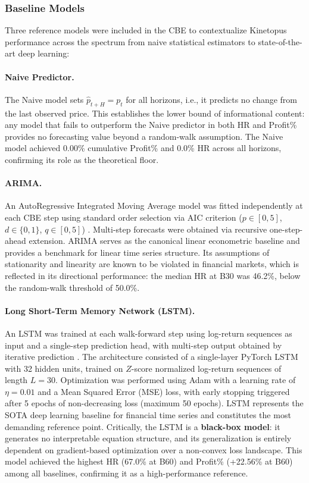 \documentclass[11pt,a4paper]{article}
\begin{document}
\subsubsection{Baseline Models}
Three reference models were included in the CBE to contextualize Kinetopus performance across the spectrum from naive statistical estimators to state-of-the-art deep learning:

\paragraph{Naive Predictor.} The Naive model sets $\hat{p}_{t+H} = p_t$ for all horizons, i.e., it predicts no change from the last observed price. This establishes the lower bound of informational content: any model that fails to outperform the Naive predictor in both HR and Profit\% provides no forecasting value beyond a random-walk assumption. The Naive model achieved 0.00\% cumulative Profit\% and 0.0\% HR across all horizons, confirming its role as the theoretical floor.

\paragraph{ARIMA.} An AutoRegressive Integrated Moving Average model was fitted independently at each CBE step using standard order selection via AIC criterion ($p \in [0,5]$, $d \in \{0,1\}$, $q \in [0,5]$) \cite{box1970time}. Multi-step forecasts were obtained via recursive one-step-ahead extension. ARIMA serves as the canonical linear econometric baseline and provides a benchmark for linear time series structure. Its assumptions of stationarity and linearity are known to be violated in financial markets, which is reflected in its directional performance: the median HR at B30 was 46.2\%, below the random-walk threshold of 50.0\%.

\paragraph{Long Short-Term Memory Network (LSTM).} An LSTM was trained at each walk-forward step using log-return sequences as input and a single-step prediction head, with multi-step output obtained by iterative prediction \cite{hochreiter1997long}. The architecture consisted of a single-layer PyTorch LSTM with 32 hidden units, trained on $Z$-score normalized log-return sequences of length $L = 30$. Optimization was performed using Adam with a learning rate of $\eta = 0.01$ and a Mean Squared Error (MSE) loss, with early stopping triggered after 5 epochs of non-decreasing loss (maximum 50 epochs). LSTM represents the SOTA deep learning baseline for financial time series \cite{fischer2018deep} and constitutes the most demanding reference point. Critically, the LSTM is a \textbf{black-box model}: it generates no interpretable equation structure, and its generalization is entirely dependent on gradient-based optimization over a non-convex loss landscape. This model achieved the highest HR (67.0\% at B60) and Profit\% (+22.56\% at B60) among all baselines, confirming it as a high-performance reference.
\end{document}
